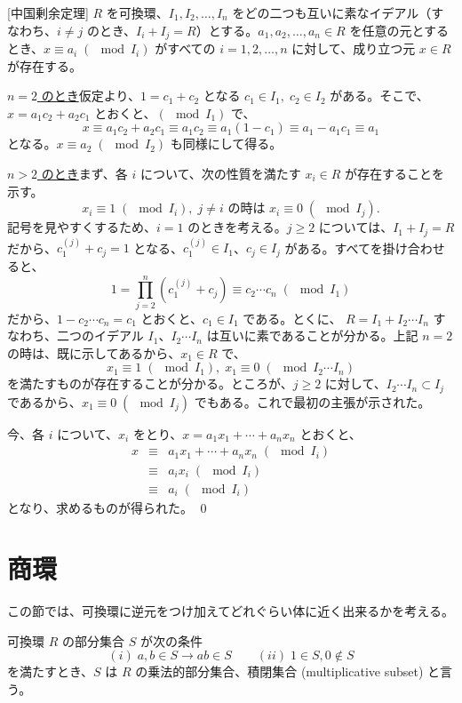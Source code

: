\begin{thm} {\rm [中国剰余定理]}\label{thm:crt}
$R$ を可換環、$I_1, I_2, \ldots, I_n$ をどの二つも互いに素なイデアル（すなわち、$i\neq j$  のとき、$I_i + I_j = R$）とする。$a_1, a_2, \ldots, a_n\in R$  を任意の元とするとき、$x\equiv a_i\;(\mod I_i)$ がすべての $i = 1, 2, \ldots, n$ に対して、成り立つ元 $x\in R$ が存在する。
\end{thm}
\proof
\underline{$n = 2$ のとき}\quad 仮定より、$1 = c_1 + c_2$ となる $c_1\in I_1,\;c_2\in I_2$ がある。そこで、$x = a_1c_2 + a_2c_1$ とおくと、$(\mod I_1)$ で、
$$x\equiv a_1c_2 + a_2c_1 \equiv a_1c_2 \equiv a_1(1-c_1) \equiv a_1 - a_1c_1 \equiv a_1$$
となる。$x \equiv a_2 \;(\mod I_2)$ も同様にして得る。

\underline{$n > 2$ のとき}\quad まず、各 $i$ について、次の性質を満たす $x_i\in R$ が存在することを示す。
$$x_i \equiv 1 \;(\mod I_i),\;j\neq i \mbox{ の時は } x_i\equiv 0\;(\mod I_j).$$
記号を見やすくするため、$i = 1$ のときを考える。$j\geq 2$ については、$I_1 + I_j = R$ だから、$c_1^{(j)}+c_j = 1$ となる、$c_1^{(j)}\in I_1$、$c_j\in I_j$ がある。すべてを掛け合わせると、
$$1 = \prod_{j=2}^n(c_1^{(j)}+c_j) \equiv c_2\cdots c_n\;(\mod I_1)$$
だから、$1 - c_2\cdots c_n = c_1$ とおくと、$c_1\in I_1$ である。とくに、
$R = I_1 + I_2\cdots I_n$ すなわち、二つのイデアル $I_1$、$I_2\cdots I_n$ は互いに素であることが分かる。上記 $n=2$ の時は、既に示してあるから、$x_1\in R$ で、
$$x_1\equiv 1 \;(\mod I_1),\;x_1\equiv 0\;(\mod I_2\cdots I_n)$$
を満たすものが存在することが分かる。ところが、$j\geq 2$ に対して、$I_2\cdots I_n \subset I_j$ であるから、$x_1\equiv 0\;(\mod I_j)$ でもある。これで最初の主張が示された。

今、各 $i$ について、$x_i$ をとり、$x = a_1x_1 + \cdots + a_nx_n$ とおくと、
\begin{eqnarray*}
x & \equiv & a_1x_1 + \cdots + a_nx_n \;(\mod I_i)\\
& \equiv & a_ix_i \;(\mod I_i)\\
& \equiv & a_i \;(\mod I_i)
\end{eqnarray*}
となり、求めるものが得られた。
\qed

\newpage
\section{商環}
この節では、可換環に逆元をつけ加えてどれぐらい体に近く出来るかを考える。

\begin{definition}
可換環 $R$ の部分集合 $S$ が次の条件
$$(i)\;a,b\in S\rightarrow ab\in S\qquad (ii)\;1\in S,0\not\in S$$
を満たすとき、$S$ は $R$ の乗法的部分集合、積閉集合 (multiplicative subset) と言う。
\end{definition}

